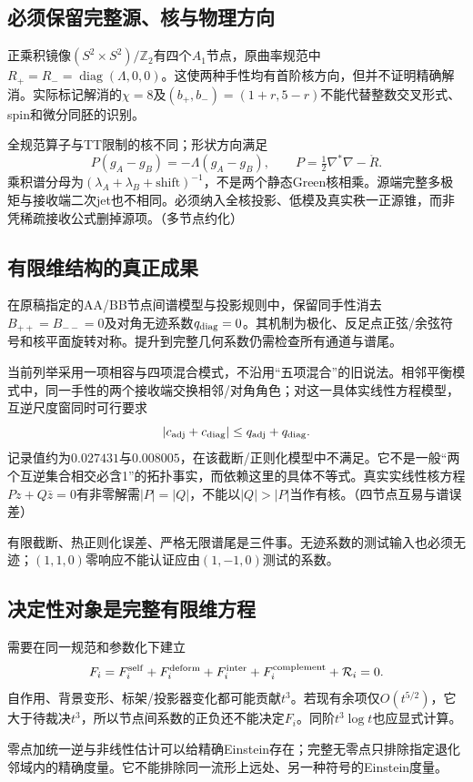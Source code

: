 \documentclass[UTF8,fontset=fandol,zihao=-4]{ctexart}
\theoremstyle{research}
\newcommand{\Z}{\mathbb Z}
\numberwithin{equation}{section}
\begin{document}
\subsection{必须保留完整源、核与物理方向}
正乘积镜像$(S^2\times S^2)/\Z_2$有四个$A_1$节点，原曲率规范中$R_+=R_-=\operatorname{diag}(\Lambda,0,0)$。这使两种手性均有首阶核方向，但并不证明精确解消。实际标记解消的$\chi=8$及$(b_+,b_-)=(1+r,5-r)$不能代替整数交叉形式、spin和微分同胚的识别。

全规范算子与TT限制的核不同；形状方向满足
\[
P(g_A-g_B)=-\Lambda(g_A-g_B),\qquad
P=\tfrac12\nabla^*\nabla-\mathring R.
\]
乘积谱分母为$(\lambda_A+\lambda_B+\text{shift})^{-1}$，不是两个静态Green核相乘。源端完整多极矩与接收端二次jet也不相同。必须纳入全核投影、低模及真实秩一正源锥，而非凭稀疏接收公式删掉源项。\cite{C}（多节点约化）

\subsection{有限维结构的真正成果}
在原稿指定的AA/BB节点间谱模型与投影规则中，保留同手性消去$B_{++}=B_{--}=0$及对角无迹系数$q_{\rm diag}=0$。其机制为极化、反足点正弦/余弦符号和核平面旋转对称。提升到完整几何系数仍需检查所有通道与谱尾。

当前列举采用一项相容与四项混合模式，不沿用“五项混合”的旧说法。相邻平衡模式中，同一手性的两个接收端交换相邻/对角角色；对这一具体实线性方程模型，互逆尺度窗同时可行要求
\[
|c_{\rm adj}+c_{\rm diag}|\le q_{\rm adj}+q_{\rm diag}.
\]
记录值约为$0.027431$与$0.008005$，在该截断/正则化模型中不满足。它不是一般“两个互逆集合相交必含1”的拓扑事实，而依赖这里的具体不等式。真实实线性核方程$Pz+Q\bar z=0$有非零解需$|P|=|Q|$，不能以$|Q|>|P|$当作有核。\cite{C}（四节点互易与谱误差）

有限截断、热正则化误差、严格无限谱尾是三件事。无迹系数的测试输入也必须无迹；$(1,1,0)$零响应不能认证应由$(1,-1,0)$测试的系数。

\subsection{决定性对象是完整有限维方程}
需要在同一规范和参数化下建立
\[
F_i=F_i^{\rm self}+F_i^{\rm deform}+F_i^{\rm inter}
+F_i^{\rm complement}+\mathcal R_i=0.
\]
自作用、背景变形、标架/投影器变化都可能贡献$t^3$。若现有余项仅$O(t^{5/2})$，它大于待裁决$t^3$，所以节点间系数的正负还不能决定$F_i$。同阶$t^3\log t$也应显式计算。

零点加统一逆与非线性估计可以给精确Einstein存在；完整无零点只排除指定退化邻域内的精确度量。它不能排除同一流形上远处、另一种符号的Einstein度量。\cite{C}\cite{OzuchII,OzuchH}
\end{document}

